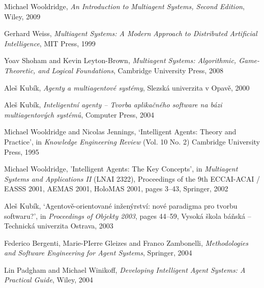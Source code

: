 \begin{thebibliography}{99}


Michael Wooldridge,
\textit{An Introduction to Multiagent Systems, Second Edition},
Wiley, 2009

Gerhard Weiss,
\textit{Multiagent Systems: A Modern Approach to Distributed Artificial Intelligence},
MIT Press, 1999

Yoav Shoham and Kevin Leyton-Brown,
\textit{Multiagent Systems: Algorithmic, Game-Theoretic, and Logical Foundations},
Cambridge University Press, 2008

Aleš Kubík,
\textit{Agenty a multiagentové systémy},
Slezská univerzita v Opavě, 2000

Aleš Kubík,
\textit{Inteligentní agenty -- Tvorba aplikačného software na bázi multiagentových systémů},
Computer Press, 2004

Michael Wooldridge and Nicolas Jennings,
`Intelligent Agents: Theory and Practice',
in \textit{Knowledge Engineering Review} (Vol. 10 No. 2)
Cambridge University Press, 1995

Michael Wooldridge,
'Intelligent Agents: The Key Concepts',
in \textit{Multiagent Systems and Applications II} (LNAI 2322),
Proceedings of the 9th ECCAI-ACAI / EASSS 2001, AEMAS 2001, HoloMAS 2001,
pages 3--43,
Springer, 2002 

Aleš Kubík,
`Agentově-orientované inženýrství: nové paradigma pro tvorbu softwaru?',
in \textit{Proceedings of Objekty 2003},
pages 44--59,
Vysoká škola báňská – Technická univerzita Ostrava, 2003


Federico Bergenti, Marie-PIerre Gleizes and Franco Zambonelli,
\textit{Methodologies and Software Engineering for Agent Systems},
Springer, 2004

Lin Padgham and Michael Winikoff,
\textit{Developing Intelligent Agent Systems: A Practical Guide},
Wiley, 2004



\end{thebibliography}
